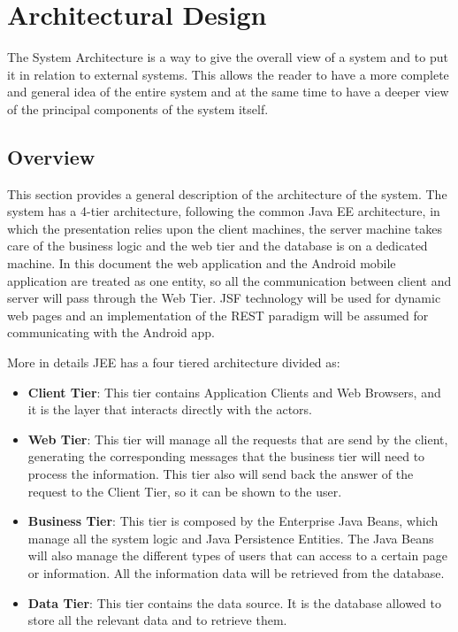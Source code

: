 \chapter{Architectural Design} \label{chap2}
The System Architecture is a way to give the overall view of a system and to put it in relation to external systems. This allows the reader to have a more complete and general idea of the entire system and at the same time to have a deeper view of the principal components of the system itself.

\section{Overview}
This section provides a general description of the architecture of the system.
The system has a 4-tier architecture, following the common Java EE architecture, in which the presentation relies upon the client machines, the server machine takes care of the business logic and the web tier and the database is on a dedicated machine.
In this document the web application and the Android mobile application are treated as one entity, so all the communication between client and server will pass through the Web Tier. JSF technology will be used for dynamic web pages and an implementation of the REST paradigm will be assumed for communicating with the Android app.

More in details JEE has a four tiered architecture divided as:
\begin{itemize}
	\item \textbf{Client Tier}: This tier contains Application Clients and Web Browsers, and it is the layer that interacts directly with the actors.
	\item \textbf{Web Tier}: This tier will manage all the requests that are send by the client, generating the corresponding messages that the business tier will need to process the information. This tier also will send back the answer of the request to the Client Tier, so it can be shown to the user. 
	\item \textbf{Business Tier}: This tier is composed by the Enterprise Java Beans, which manage all the system logic and Java Persistence Entities. The Java Beans will also manage the different types of users that can access to a certain page or information. All the information data will be retrieved from the database.
	\item \textbf{Data Tier}: This tier contains the data source. It is the database allowed to store all the relevant data and to retrieve them.
\end{itemize}

